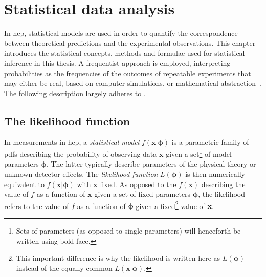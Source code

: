 

\chapter{Statistical data analysis}\label{ch:statistics}

\graphicspath{{chapter-statistics/Figs/Vector/}{chapter-statistics/Figs/}}

In \gls{hep}, statistical models are used in order to quantify the correspondence between theoretical predictions and the experimental observations.
This chapter introduces the statistical concepts, methods and formulae used for statistical inference in this thesis.
A frequentist approach is employed, interpreting probabilities as the frequencies of the outcomes of repeatable experiments that may either be real, based on computer simulations, or mathematical abstraction~\cite{pdg2020}.
The following description largely adheres to \cite{Cranmer:2015nia, Cowan:2010js}.

\section{The likelihood function}\label{sec:likelihood_function}
 
In measurements in \gls{hep}, a \textit{statistical model} $f(\boldsymbol{x}\vert\boldsymbol{\phi})$ is a parametric family of \glspl{pdf} describing the probability of observing data $\boldsymbol{x}$ given a set\footnote{Sets of parameters (as opposed to single parameters) will henceforth be written using bold face.} of model parameters $\boldsymbol{\phi}$.
The latter typically describe parameters of the physical theory or unknown detector effects. The \textit{likelihood function} $L(\boldsymbol{\phi})$ is then numerically equivalent to $f(\boldsymbol{x}\vert\boldsymbol{\phi})$ with $\boldsymbol{x}$ fixed.
As opposed to the  $f(\boldsymbol{x})$ describing the value of $f$ as a function of $\boldsymbol{x}$ given a set of fixed parameters $\boldsymbol{\phi}$, the likelihood refers to the value of $f$ as a function of $\boldsymbol{\phi}$ given a fixed\footnote{This important difference is why the likelihood is written here as $L(\boldsymbol{\phi})$ instead of the equally common $L(\boldsymbol{x}\vert\boldsymbol{\phi})$.} value of $\boldsymbol{x}$.

